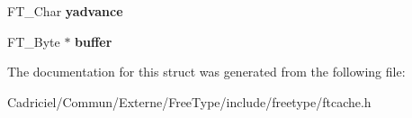 \begin{DoxyCompactItemize}
\item 
\hypertarget{struct_f_t_c___s_bit_rec___aabe767ddaf7ff62918886c6f62e9ac28}{F\-T\-\_\-\-Char {\bfseries yadvance}}\label{struct_f_t_c___s_bit_rec___aabe767ddaf7ff62918886c6f62e9ac28}

\item 
\hypertarget{struct_f_t_c___s_bit_rec___abe4d78fc3f411d67e7fc43f7aa21bd1d}{F\-T\-\_\-\-Byte $\ast$ {\bfseries buffer}}\label{struct_f_t_c___s_bit_rec___abe4d78fc3f411d67e7fc43f7aa21bd1d}

\end{DoxyCompactItemize}


The documentation for this struct was generated from the following file\-:\begin{DoxyCompactItemize}
\item 
Cadriciel/\-Commun/\-Externe/\-Free\-Type/include/freetype/ftcache.\-h\end{DoxyCompactItemize}
